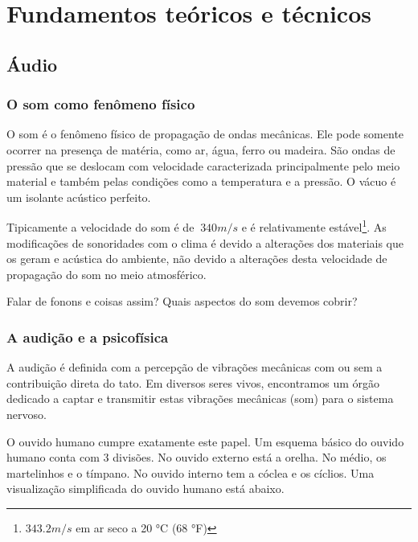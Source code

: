 \chapter{Fundamentos teóricos e técnicos} %
\label{cap:intro} %

\section{Áudio}

\subsection{O som como fenômeno físico}

O som é o fenômeno físico de propagação de ondas mecânicas. Ele pode
somente ocorrer na presença de matéria, como ar, água, ferro ou madeira.
São ondas de pressão que se deslocam com velocidade caracterizada principalmente
pelo meio material e também pelas condições como a temperatura e a pressão.
O vácuo é um isolante acústico perfeito.

Tipicamente a velocidade do som é de $~340 m/s $ e é
relativamente estável\footnote{$343.2 m/s$ em ar seco a 20 °C (68 °F)}.
As modificações de sonoridades com o clima é devido a alterações
dos materiais que os geram e acústica do ambiente, não devido a alterações
desta velocidade de propagação do som no meio atmosférico.

Falar de fonons e coisas assim? Quais aspectos do som devemos cobrir?

\subsection{A audição e a psicofísica}

A audição é definida com a percepção de vibrações mecânicas com
ou sem a contribuição direta do tato. Em diversos
seres vivos, encontramos um órgão dedicado a captar e transmitir
estas vibrações mecânicas (som) para o sistema nervoso.

O ouvido humano cumpre exatamente este papel. Um esquema básico
do ouvido humano conta com 3 divisões. No ouvido externo está a orelha.
No médio, os martelinhos e o tímpano. No ouvido interno tem a cóclea
e os cíclios. Uma visualização simplificada do ouvido humano está abaixo.


